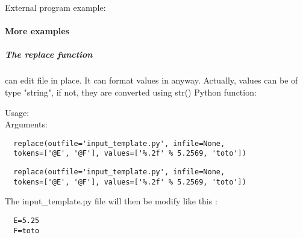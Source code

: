 
External program example:



\paragraph{More examples}

\subparagraph{The replace function} can edit file in place. It can format values in anyway. Actually, values can be of type "string", if not, they are converted using str() Python function:

\begin{description}
\item[Usage:] \rule{0pt}{1em}
\item[Arguments:] \rule{0pt}{1em}
\end{description}
\bigskip


\begin{lstlisting}
  replace(outfile='input_template.py', infile=None,
  tokens=['@E', '@F'], values=['%.2f' % 5.2569, 'toto'])
\end{lstlisting}


\begin{lstlisting}
  replace(outfile='input_template.py', infile=None,
  tokens=['@E', '@F'], values=['%.2f' % 5.2569, 'toto'])
\end{lstlisting}

The input\_template.py file will then be modify like this :
\begin{lstlisting}
  E=5.25
  F=toto
\end{lstlisting}

